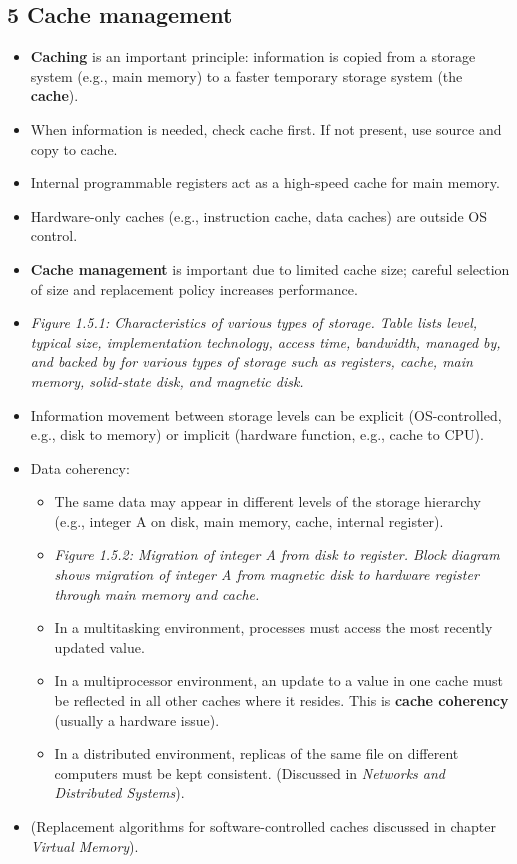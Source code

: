 \documentclass{article}
\begin{document}
\subsection*{5 Cache management}
\begin{itemize}
    \item \textbf{Caching} is an important principle: information is copied from a storage system (e.g., main memory) to a faster temporary storage system (the \textbf{cache}).
    \item When information is needed, check cache first. If not present, use source and copy to cache.
    \item Internal programmable registers act as a high-speed cache for main memory.
    \item Hardware-only caches (e.g., instruction cache, data caches) are outside OS control.
    \item \textbf{Cache management} is important due to limited cache size; careful selection of size and replacement policy increases performance.
    \item \textit{Figure 1.5.1: Characteristics of various types of storage. Table lists level, typical size, implementation technology, access time, bandwidth, managed by, and backed by for various types of storage such as registers, cache, main memory, solid-state disk, and magnetic disk.}
    \item Information movement between storage levels can be explicit (OS-controlled, e.g., disk to memory) or implicit (hardware function, e.g., cache to CPU).
    \item Data coherency:
    \begin{itemize}
        \item The same data may appear in different levels of the storage hierarchy (e.g., integer A on disk, main memory, cache, internal register).
        \item \textit{Figure 1.5.2: Migration of integer A from disk to register. Block diagram shows migration of integer A from magnetic disk to hardware register through main memory and cache.}
        \item In a multitasking environment, processes must access the most recently updated value.
        \item In a multiprocessor environment, an update to a value in one cache must be reflected in all other caches where it resides. This is \textbf{cache coherency} (usually a hardware issue).
        \item In a distributed environment, replicas of the same file on different computers must be kept consistent. (Discussed in \textit{Networks and Distributed Systems}).
    \end{itemize}
    \item (Replacement algorithms for software-controlled caches discussed in chapter \textit{Virtual Memory}).
\end{itemize}
\end{document}

